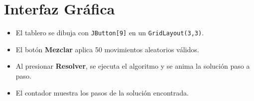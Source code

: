 \documentclass[12pt,a4paper]{article}
\begin{document}
\section{Interfaz Gráfica}

\begin{itemize}
  \item El tablero se dibuja con \texttt{JButton[9]} en un \texttt{GridLayout(3,3)}.
  \item El botón \textbf{Mezclar} aplica 50 movimientos aleatorios válidos.
  \item Al presionar \textbf{Resolver}, se ejecuta el algoritmo y se anima la solución paso a paso.
  \item El contador muestra los pasos de la solución encontrada.
\end{itemize}
\end{document}
